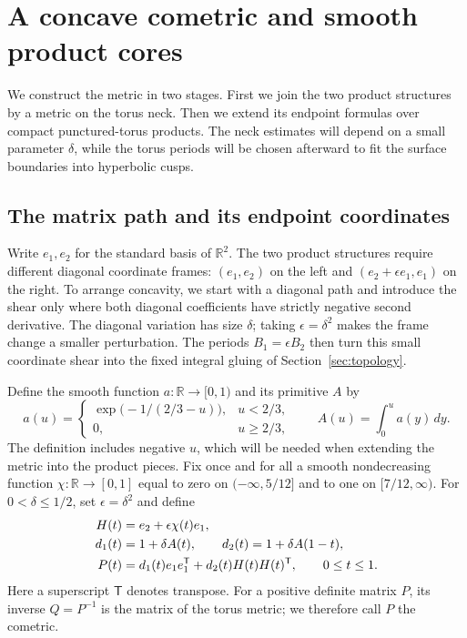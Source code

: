 \section{A concave cometric and smooth product cores}
\label{sec:cometric}

We construct the metric in two stages.  First we join the two product
structures by a metric on the torus neck.  Then we extend its endpoint
formulas over compact punctured-torus products.  The neck estimates will
depend on a small parameter $\delta$, while the torus periods will be
chosen afterward to fit the surface boundaries into hyperbolic cusps.

\subsection{The matrix path and its endpoint coordinates}

Write $e_1,e_2$ for the standard basis of $\mathbb R^2$.
The two product structures require different diagonal coordinate frames:
$(e_1,e_2)$ on the left and $(e_2+\epsilon e_1,e_1)$ on the right.
To arrange concavity, we start with a diagonal path and introduce the
shear only where both diagonal coefficients have strictly negative
second derivative.  The diagonal variation has size $\delta$;
taking $\epsilon=\delta^2$ makes the frame change a smaller perturbation.
The periods $B_1=\epsilon B_2$ then turn this small coordinate shear into
the fixed integral gluing of Section~\ref{sec:topology}.

Define the
smooth function $a:\mathbb R\to[0,1)$ and its primitive $A$ by
\begin{equation}\label{eq:cometric-cutoff}
 a(u)=\begin{cases}
       \exp\bigl(-1/(2/3-u)\bigr),&u<2/3,\\
       0,&u\ge 2/3,
      \end{cases}
 \qquad A(u)=\int_0^u a(y)\,dy.
\end{equation}
The definition includes negative $u$, which will be needed when extending
the metric into the product pieces.  Fix once and for all a smooth
nondecreasing function $\chi:\mathbb R\to[0,1]$ equal to zero on
$(-\infty,5/12]$ and to one on $[7/12,\infty)$.
For $0<\delta\le 1/2$, set $\epsilon=\delta^2$ and define
\begin{align}
 H(t)&=e_2+\epsilon\chi(t)e_1,\notag\\
 d_1(t)&=1+\delta A(t),\qquad
 d_2(t)=1+\delta A(1-t),\notag\\
 P(t)&=d_1(t)e_1e_1^{\mathsf T}+d_2(t)H(t)H(t)^{\mathsf T},
 \qquad 0\le t\le1.
 \label{eq:cometric-path}
\end{align}
Here a superscript $\mathsf T$ denotes transpose.  For a positive definite
matrix $P$, its inverse $Q=P^{-1}$ is the matrix of the torus metric;
we therefore call $P$ the cometric.

